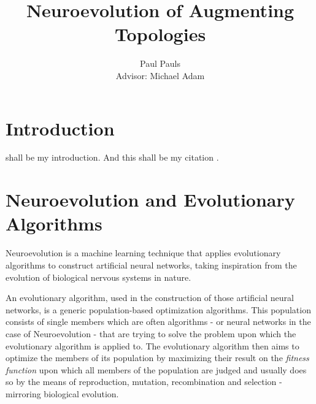 \documentclass[journal, a4paper]{IEEEtran}
\begin{document}
  \title{Neuroevolution of Augmenting Topologies}
  \author{Paul Pauls\\
          Advisor: Michael Adam}
  \maketitle

\tableofcontents

\begin{abstract}
\blindtext
\end{abstract}


\section{Introduction}

 shall be my introduction. And this shall be my citation \cite{cite01}.
\blindtext




\section{Neuroevolution and Evolutionary Algorithms}
Neuroevolution  is  a  machine  learning  technique  that  applies  evolutionary   algorithms   to  construct artificial  neural networks,  taking  inspiration  from  the  evolution  of  biological nervous systems in nature. \cite{cite02}

An evolutionary algorithm, used in the construction of those artificial neural networks, is a generic population-based optimization algorithms. This population consists of single members which are often algorithms - or neural networks in the case of Neuroevolution - that are trying to solve the problem upon which the evolutionary algorithm is applied to. The evolutionary algorithm then aims to optimize the members of its population by maximizing their result on the \textit{fitness function} upon which all members of the population are judged and usually does so by the means of reproduction, mutation, recombination and selection - mirroring biological evolution.
\end{document}
